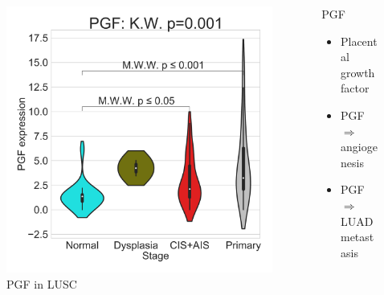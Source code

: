 \documentclass{beamer}
\begin{document}
\begin{frame}[allowframebreaks]
                    \begin{columns}
                        \begin{column}{0.4 \textwidth}
                            \begin{figure}
                                \includegraphics[width=\linewidth]{figures/DEG/Violin/STAR.TPM.SQC.senescence/PGF.pdf}
                                \caption{PGF in LUSC}
                            \end{figure}
                        \end{column}
                        \begin{column}{0.55 \textwidth}
                            \begin{block}{PGF}
                                \begin{itemize}
                                    \item Placental growth factor
                                    \item PGF $\Rightarrow$ angiogenesis \cite{PGF-01}
                                    \item PGF $\Rightarrow$ LUAD metastasis \cite{PGF-02}
                                \end{itemize}
                            \end{block}
                        \end{column}
                    \end{columns}


\end{frame}
\end{document}
